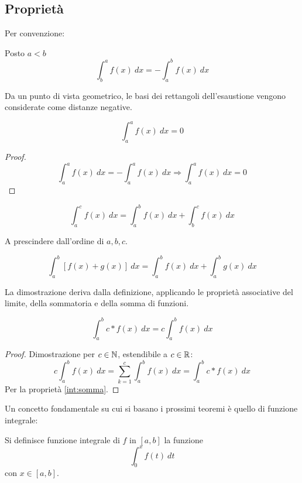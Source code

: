 \subsection{Proprietà}
Per convenzione:
\begin{prop}
	Posto $a<b$
	\[
		\int_b^a f(x)~dx=-\int_a^b f(x)~dx
	\]
\end{prop}
Da un punto di vista geometrico, le basi dei rettangoli dell'esaustione vengono considerate come distanze negative.
\begin{prop}
	\[
		\int_a^a f(x)~dx=0
	\]
\end{prop}
\begin{proof}
	\[
		\int_a^a f(x)~dx=-\int_a^a f(x)~dx\Rightarrow \int_a^a f(x)~dx=0
	\]
\end{proof}
\begin{prop}
	\label{prop:intint}
	\[
		\int_a^c f(x)~dx=\int_a^b f(x)~dx+\int_b^c f(x)~dx
	\]
\end{prop}
A prescindere dall'ordine di $a,b,c$.
\begin{prop} \label{int:somma}
	\[
		\int_a^b [f(x)+g(x)]~dx=\int_a^b f(x)~dx+\int_a^b g(x)~dx
	\]
\end{prop}
La dimostrazione deriva dalla definizione, applicando le proprietà associative del limite, della sommatoria e della somma di funzioni.
\begin{prop}
	\label{int:linearita}
	\[
		\int_a^b c*f(x)~dx=c\int_a^b f(x)~dx
	\]
\end{prop}
\begin{proof}
	Dimostrazione per $c\in\mathbb{N}$, estendibile a $c\in\mathbb{R}$:
	\[
		c\int_a^b f(x)~dx=\sum_{k=1}^c \int_a^b f(x)~dx=\int_a^b c*f(x)~dx
	\]
	Per la proprietà \ref{int:somma}.
\end{proof}

Un concetto fondamentale su cui si basano i prossimi teoremi è quello di funzione integrale:
\begin{defin}
	Si definisce funzione integrale di $f$ in $[a,b]$ la funzione
	\[
		\int_0^x f(t)~dt
	\]
	con $x\in[a,b]$.
\end{defin}


